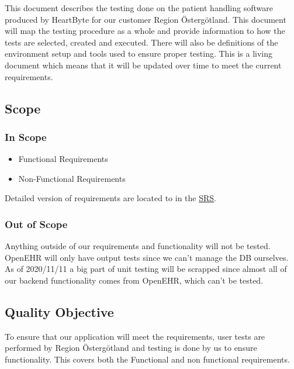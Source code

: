 
This document describes the testing done on the patient handling software produced by HeartByte for our customer Region Östergötland. This document will map the testing procedure as a whole and provide information to how the tests are selected, created and executed. There will also be definitions of the environment setup and tools used to ensure proper testing. This is a living document which means that it will be updated over time to meet the current requirements.

\subsection{Scope}
\subsubsection{In Scope}

\begin{itemize}
  \item Functional Requirements
\end{itemize}


\begin{itemize}
    \item Non-Functional Requirements 
\end{itemize}

  Detailed version of requirements are located to in the \href{https://gitlab.liu.se/tddc88-company-3-2020/deploy/-/tree/Document_branch/Software\%20Requirements\%20Specification}{\underline SRS}. 

  
  


\subsubsection{Out of Scope}
Anything outside of our requirements and functionality will not be tested. OpenEHR will only have output tests since we can't manage the DB ourselves. As of 2020/11/11 a big part of unit testing will be scrapped since almost all of our backend functionality comes from OpenEHR, which can't be tested.
\subsection{Quality Objective}
To ensure that our application will meet the requirements, user tests are performed by Region Östergötland and testing is done by us to ensure functionality. This covers both the Functional and non functional requirements. 

